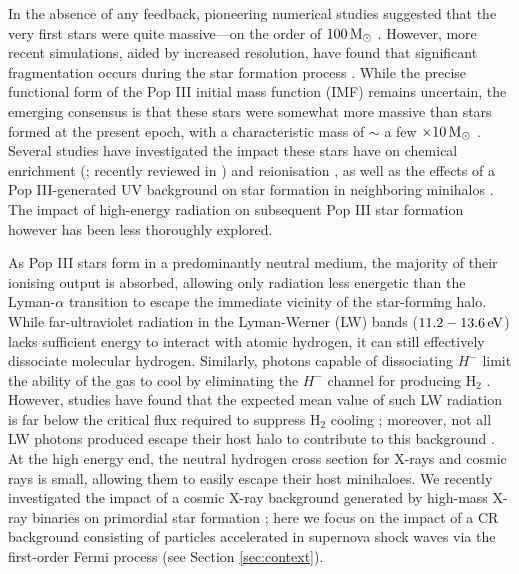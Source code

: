 \documentclass[usenatbib]{mn2e}
\newcommand{\msun}{\,{\rm M}_{\odot}}
\newcommand{\ev}{\,{\rm eV}}
\newcommand{\htwo}{\mathrm{H}_2}
\begin{document}
In the absence of any feedback, pioneering numerical studies suggested that the very first stars were quite massive---on the order of $100\msun$ \citep[e.g.,][]{BrommCoppiLarson1999,BrommCoppiLarson2002,AbelBryanNorman2002,Yoshidaetal2003,BrommLarson2004,Yoshidaetal2006,OSheaNorman2007}. 
However, more recent simulations, aided by increased resolution, have found that significant fragmentation occurs during the star formation process \citep{TurkAbelOShea2009,StacyGreifBromm2010,Clarketal2011a,Clarketal2011b,Greifetal2011,Greifetal2012,StacyBromm2013,Hiranoetal2014,Hosokawaetal2015}.
While the precise functional form of the Pop III initial mass function (IMF) remains uncertain, the emerging consensus is that these stars were somewhat more massive than stars formed at the present epoch, with a characteristic mass of $\sim$ a few $\times 10\msun$ \citep{Bromm2013, Greif2015}. 
Several studies have investigated the impact these stars have on chemical enrichment (\citealt{MadauFerraraRees2001,MoriFerraraMadau2002,BrommYoshidaHernquist2003,MackeyBrommHernquist2003,Hegeretal2003,UmedaNomoto2003,BrommLarson2004,KitayamaYoshida2005,TornatoreFerraraSchneider2007,Greifetal2007,Greifetal2010,WiseAbel2008,Maioetal2011}; recently reviewed in \citealt{Whalenetal2008,Joggerstetal2010,KarlssonBrommHawthorn2013}) and  reionisation \citep{Kitayamaetal2004,Sokasianetal2004,WhalenAbelNorman2004,AlvarezBrommShapiro2006,JohnsonGreifBromm2007,Robertsonetal2010}, as well as the effects of a Pop III-generated UV background on star formation in neighboring minihalos \citep{ShapiroIlievRaga2004,IlievShapiroRaga2005,OSheaetal2005,SusaUmemura2006,Susa2007,Whalenetal2008a,HasegawaUmemura2009,WhalenHueckstaedtMcConkie2010}.
The impact of high-energy radiation on subsequent Pop III star formation however has been less thoroughly explored.

As Pop III stars form in a predominantly neutral medium, the majority of their ionising output is absorbed, allowing only radiation less energetic than the Lyman-$\alpha$ transition to escape the immediate vicinity of the star-forming halo.  
While far-ultraviolet radiation in the Lyman-Werner (LW) bands ($11.2 - 13.6\ev$) lacks sufficient energy to interact with atomic hydrogen, it can still effectively dissociate molecular hydrogen.
Similarly, photons capable of dissociating $H^-$ limit the ability of the gas to cool by eliminating the $H^-$ channel for producing $\htwo$ \citep{Agarwaletal2012,Agarwaletal2016}.
However, studies have found that the expected mean value of such LW radiation is far below the critical flux required to suppress $\htwo$ cooling \mbox{\citep{Dijkstraetal2008}}; moreover, not all LW photons produced escape their host halo to contribute to this background \citep{Schaueretal2015}.
At the high energy end, the neutral hydrogen cross section for X-rays and cosmic rays is small, allowing them to easily escape their host minihaloes. 
We recently investigated the impact of a cosmic X-ray background generated by high-mass X-ray binaries on primordial star formation \citep{Hummeletal2015}; here we focus on the impact of a CR background consisting of particles accelerated in supernova shock waves via the first-order Fermi process (see Section \ref{sec:context}).  
\end{document}
